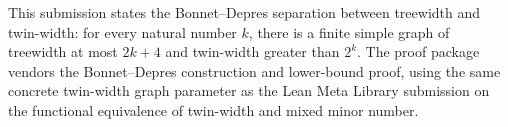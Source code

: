 This submission states the Bonnet--Depres separation between treewidth and twin-width: for every natural number $k$, there is a finite simple graph of treewidth at most $2k+4$ and twin-width greater than $2^k$.  The proof package vendors the Bonnet--Depres construction and lower-bound proof, using the same concrete twin-width graph parameter as the Lean Meta Library submission on the functional equivalence of twin-width and mixed minor number.
